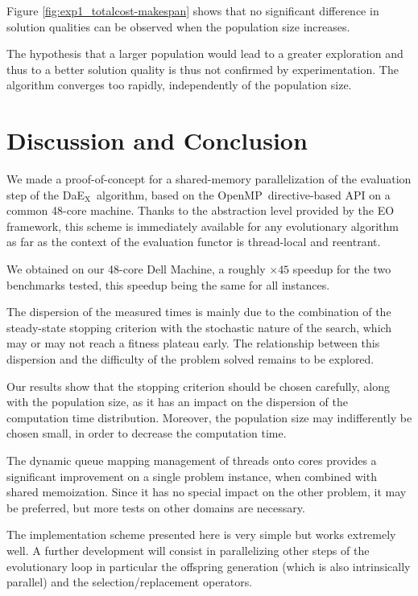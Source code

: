 \documentclass{sig-alternate}
\newcommand{\DAEX}{{\sc DaE$_{\text{X}}$}}
\newcommand{\OPENMP}{{\sc OpenMP}}
\begin{document}
Figure \ref{fig:exp1_totalcost-makespan} shows that no significant difference in
solution qualities can be observed when the population size increases.

The hypothesis that a larger population would lead to a greater exploration and
thus to a better solution quality is thus not confirmed by experimentation. The
algorithm converges too rapidly, independently of the population size.

\section{Discussion and Conclusion}
We made a proof-of-concept for a shared-memory parallelization of the evaluation
step of the \DAEX\ algorithm, based on the \OPENMP\ directive-based API on a
common 48-core machine. Thanks to the abstraction level provided by the EO
framework, this scheme is immediately available for any evolutionary algorithm
as far as the context of the evaluation functor is thread-local and reentrant.

We obtained on our 48-core Dell Machine, a roughly $\times45$ speedup for the two benchmarks tested, this speedup being the same for all instances.

The dispersion of the measured times is mainly due to the combination of the
steady-state stopping criterion with the stochastic nature of the search, which
may or may not reach a fitness plateau early. The relationship between this
dispersion and the difficulty of the problem solved remains to be explored.

Our results show that the stopping criterion should be chosen carefully, along
with the population size, as it has an impact on the dispersion of the
computation time distribution. Moreover, the population size may indifferently
be chosen small, in order to decrease the computation time.

The dynamic queue mapping management of threads onto cores provides a
significant improvement on a single problem instance, when combined with
shared memoization. Since it has no special impact on the other problem, it
may be preferred, but more tests on other domains are necessary.

The implementation scheme presented here is very simple but works extremely
well. A further development will consist in parallelizing other steps of the
evolutionary loop in particular the offspring generation (which is also
intrinsically parallel) and the selection/replacement operators.
\end{document}
